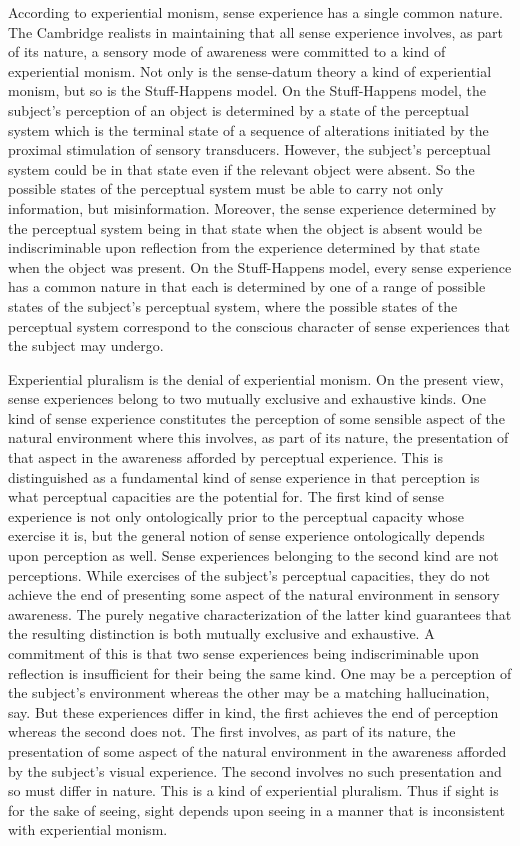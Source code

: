 \documentclass[12pt]{article}
\begin{document}
According to experiential monism, sense experience has a single common nature. The Cambridge realists in maintaining that all sense experience involves, as part of its nature, a sensory mode of awareness were committed to a kind of experiential monism. Not only is the sense-datum theory a kind of experiential monism, but so is the Stuff-Happens model. On the Stuff-Happens model, the subject's perception of an object is determined by a state of the perceptual system which is the terminal state of a sequence of alterations initiated by the proximal stimulation of sensory transducers. However, the subject's perceptual system could be in that state even if the relevant object were absent. So the possible states of the perceptual system must be able to carry not only information, but misinformation. Moreover, the sense experience determined by the perceptual system being in that state when the object is absent would be indiscriminable upon reflection from the experience determined by that state when the object was present. On the Stuff-Happens model, every sense experience has a common nature in that each is determined by one of a range of possible states of the subject's perceptual system, where the possible states of the perceptual system correspond to the conscious character of sense experiences that the subject may undergo.

Experiential pluralism is the denial of experiential monism. On the present view, sense experiences belong to two mutually exclusive and exhaustive kinds. One kind of sense experience constitutes the perception of some sensible aspect of the natural environment where this involves, as part of its nature, the presentation of that aspect in the awareness afforded by perceptual experience. This is distinguished as a fundamental kind of sense experience in that perception is what perceptual capacities are the potential for. The first kind of sense experience is not only ontologically prior to the perceptual capacity whose exercise it is, but the general notion of sense experience ontologically depends upon perception as well. Sense experiences belonging to the second kind are not perceptions. While exercises of the subject's perceptual capacities, they do not achieve the end of presenting some aspect of the natural environment in sensory awareness. The purely negative characterization of the latter kind guarantees that the resulting distinction is both mutually exclusive and exhaustive. A commitment of this is that two sense experiences being indiscriminable upon reflection is insufficient for their being the same kind. One may be a perception of the subject's environment whereas the other may be a matching hallucination, say. But these experiences differ in kind, the first achieves the end of perception whereas the second does not. The first involves, as part of its nature, the presentation of some aspect of the natural environment in the awareness afforded by the subject's visual experience. The second involves no such presentation and so must differ in nature. This is a kind of experiential pluralism. Thus if sight is for the sake of seeing, sight depends upon seeing in a manner that is inconsistent with experiential monism.
\end{document}
